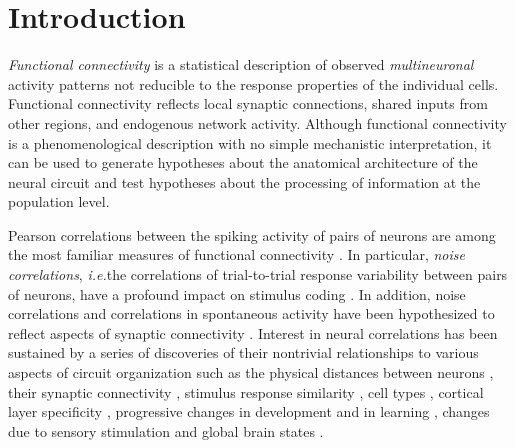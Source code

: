 \documentclass[10pt]{article}
\newcommand{\ie}{\emph{i.e.}\;}
\begin{document}
\section*{Introduction}
\emph{Functional connectivity} is a statistical description of observed \emph{multineuronal} activity patterns not reducible to the response properties of the individual cells. Functional connectivity reflects local synaptic connections, shared inputs from other regions, and endogenous network activity. Although functional connectivity is a phenomenological description with no simple mechanistic interpretation, it can be used to generate hypotheses about the anatomical architecture of the neural circuit and test hypotheses about the processing of information at the population level. 

Pearson correlations between the spiking activity of pairs of neurons are among the most familiar measures of functional connectivity \cite{Averbeck:2006, Zohary:1994, Kohn:2005, Bair:2001, Ecker:2010}.  In particular, \emph{noise correlations}, \ie the correlations of trial-to-trial response variability between pairs of neurons, have a profound impact on stimulus coding \cite{Zohary:1994, Abbott:1999, Sompolinsky:2001, Nirenberg:2003, Averbeck:2006, Josic:2009, Berens:2011, Ecker:2011}. In addition, noise correlations and correlations in spontaneous activity have been hypothesized to reflect aspects of synaptic connectivity \cite{Gerstein:1964}.  Interest in neural correlations has been sustained by a series of discoveries of their nontrivial relationships to various aspects of circuit organization such as the physical distances between neurons \cite{Smith:2008, Denman:2013}, their synaptic connectivity \cite{Ko:2011},  stimulus response similarity \cite{Bair:2001, Arieli:1995, Chiu:2002, Kenet:2003, Kohn:2005, Cohen:2008, Cohen:2009, Ecker:2010, Rothschild:2010, Ko:2011, Smith:2013b}, cell types \cite{Hofer:2011}, cortical layer specificity \cite{Hansen:2012, Smith:2013}, progressive changes in development and in learning \cite{Golshani:2009, Gu:2011, Ko:2013}, changes due to sensory stimulation and global brain states \cite{Greenberg:2008, Goard:2009, Kohn:2009, Rothschild:2010, Ecker:2010, Renart:2010}. 
\end{document}
